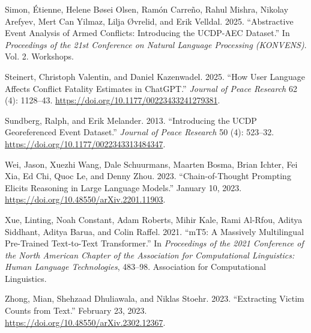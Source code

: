 \documentclass[
  11pt,
]{article}
\newlength{\cslhangindent}
\newenvironment{CSLReferences}[2] %
 {\begin{list}{}{%
  \setlength{\itemindent}{0pt}
  \setlength{\leftmargin}{0pt}
  \setlength{\parsep}{0pt}
  \ifodd #1
   \setlength{\leftmargin}{\cslhangindent}
   \setlength{\itemindent}{-1\cslhangindent}
  \fi
  \setlength{\itemsep}{#2\baselineskip}}}
 {\end{list}}
\begin{document}
\begin{CSLReferences}{1}{0}
Simon, Étienne, Helene Bøsei Olsen, Ramón Carreño, Rahul Mishra, Nikolay
Arefyev, Mert Can Yilmaz, Lilja Øvrelid, and Erik Velldal. 2025.
{``Abstractive {Event Analysis} of {Armed Conflicts}: {Introducing} the
{UCDP-AEC Dataset}.''} In \emph{Proceedings of the 21st {Conference} on
{Natural Language Processing} ({KONVENS})}. Vol. 2. Workshops.

Steinert, Christoph Valentin, and Daniel Kazenwadel. 2025. {``How User
Language Affects Conflict Fatality Estimates in {ChatGPT}.''}
\emph{Journal of Peace Research} 62 (4): 1128--43.
\url{https://doi.org/10.1177/00223433241279381}.

Sundberg, Ralph, and Erik Melander. 2013. {``Introducing the {UCDP}
Georeferenced Event Dataset.''} \emph{Journal of Peace Research} 50 (4):
523--32. \url{https://doi.org/10.1177/0022343313484347}.

Wei, Jason, Xuezhi Wang, Dale Schuurmans, Maarten Bosma, Brian Ichter,
Fei Xia, Ed Chi, Quoc Le, and Denny Zhou. 2023. {``Chain-of-{Thought
Prompting Elicits Reasoning} in {Large Language Models}.''} January 10,
2023. \url{https://doi.org/10.48550/arXiv.2201.11903}.

Xue, Linting, Noah Constant, Adam Roberts, Mihir Kale, Rami Al-Rfou,
Aditya Siddhant, Aditya Barua, and Colin Raffel. 2021. {``{mT5}: A
Massively Multilingual Pre-Trained Text-to-Text Transformer.''} In
\emph{Proceedings of the 2021 Conference of the North American Chapter
of the Association for Computational Linguistics: {Human} Language
Technologies}, 483--98. Association for Computational Linguistics.

Zhong, Mian, Shehzaad Dhuliawala, and Niklas Stoehr. 2023. {``Extracting
{Victim Counts} from {Text}.''} February 23, 2023.
\url{https://doi.org/10.48550/arXiv.2302.12367}.

\end{CSLReferences}
\end{document}
